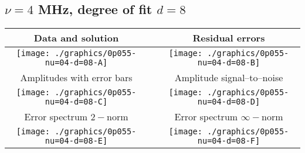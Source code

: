 

% 

\clearpage{}
\break{}

\subsection{$\nu = 4$ MHz, degree of fit $d = 8$}

\begin{table}[h]
    \begin{center}
        \begin{tabular}{ccc}
            Data and solution & \quad & Residual errors \\\hline
            \texttt{[image: ./graphics/0p055-nu=04-d=08-A]} &&
            \texttt{[image: ./graphics/0p055-nu=04-d=08-B]} \\[15pt]
            Amplitudes with error bars && Amplitude signal--to--noise \\\hline
            \texttt{[image: ./graphics/0p055-nu=04-d=08-C]} &&
            \texttt{[image: ./graphics/0p055-nu=04-d=08-D]} \\[15pt]
            Error spectrum $2-$norm && Error spectrum $\infty-$norm \\\hline
            \texttt{[image: ./graphics/0p055-nu=04-d=08-E]} &&
            \texttt{[image: ./graphics/0p055-nu=04-d=08-F]} \\[15pt]
        \end{tabular}
    \end{center}
\label{fig:elev=55, nu=4}
\end{table}



\endinput
